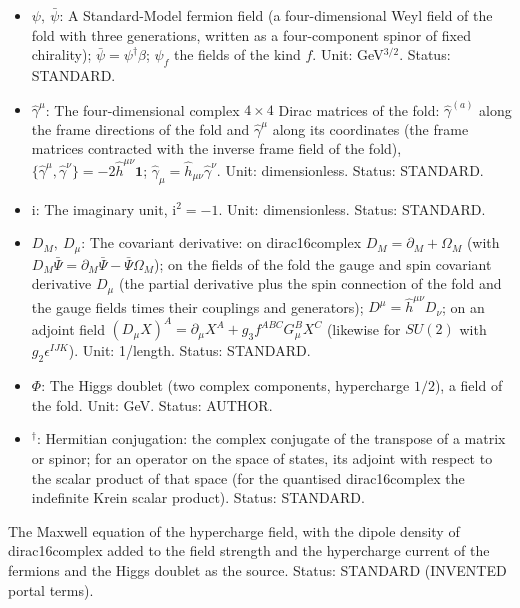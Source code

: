 \documentclass[
  10pt,
]{article}
\begin{document}
\begin{itemize}
  \(Y_f\): The hypercharge of a field, the charge of its coupling
  \(g_1Y_fB_\mu\) to the hypercharge field in the covariant derivative
  (\(1/6\), \(2/3\), \(-1/3\), \(-1/2\), \(-1\), \(0\) for
  \(Q, u_{\mathrm{R}}, d_{\mathrm{R}}, \ell, e_{\mathrm{R}}, \nu_{\mathrm{R}}\),
  \(1/2\) for \(\Phi\)). Unit: dimensionless. Status: STANDARD.
\item
  \(\psi,\ \bar\psi\): A Standard-Model fermion field (a
  four-dimensional Weyl field of the fold with three generations,
  written as a four-component spinor of fixed chirality);
  \(\bar\psi = \psi^\dagger\beta\); \(\psi_f\) the fields of the kind
  \(f\). Unit: GeV\(^{3/2}\). Status: STANDARD.
\item
  \(\hat\gamma^\mu\): The four-dimensional complex \(4 \times 4\) Dirac
  matrices of the fold: \(\hat\gamma^{(a)}\) along the frame directions
  of the fold and \(\hat\gamma^\mu\) along its coordinates (the frame
  matrices contracted with the inverse frame field of the fold),
  \(\{\hat\gamma^\mu, \hat\gamma^\nu\} = -2\hat h^{\mu\nu}\mathbf{1}\);
  \(\hat\gamma_\mu = \hat h_{\mu\nu}\hat\gamma^\nu\). Unit:
  dimensionless. Status: STANDARD.
\item
  \(\mathrm{i}\): The imaginary unit, \(\mathrm{i}^2 = -1\). Unit:
  dimensionless. Status: STANDARD.
\item
  \(D_M,\ D_\mu\): The covariant derivative: on dirac16complex
  \(D_M = \partial_M + \Omega_M\) (with
  \(D_M\bar\Psi = \partial_M\bar\Psi - \bar\Psi\Omega_M\)); on the
  fields of the fold the gauge and spin covariant derivative \(D_\mu\)
  (the partial derivative plus the spin connection of the fold and the
  gauge fields times their couplings and generators);
  \(D^\mu = \hat h^{\mu\nu}D_\nu\); on an adjoint field
  \((D_\mu X)^A = \partial_\mu X^A + g_3f^{ABC}G^B_\mu X^C\) (likewise
  for \(SU(2)\) with \(g_2\epsilon^{IJK}\)). Unit: 1/length. Status:
  STANDARD.
\item
  \(\Phi\): The Higgs doublet (two complex components, hypercharge
  \(1/2\)), a field of the fold. Unit: GeV. Status: AUTHOR.
\item
  \({}^\dagger\): Hermitian conjugation: the complex conjugate of the
  transpose of a matrix or spinor; for an operator on the space of
  states, its adjoint with respect to the scalar product of that space
  (for the quantised dirac16complex the indefinite Krein scalar
  product). Status: STANDARD.
\end{itemize}

The Maxwell equation of the hypercharge field, with the dipole density
of dirac16complex added to the field strength and the hypercharge
current of the fermions and the Higgs doublet as the source. Status:
STANDARD (INVENTED portal terms).
\end{document}
